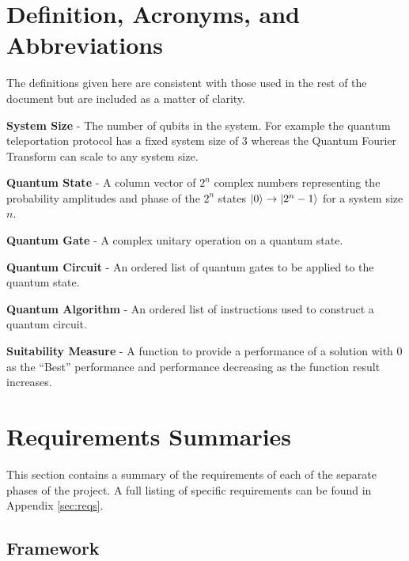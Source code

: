 % 

\section{Definition, Acronyms, and Abbreviations}
The definitions given here are consistent with those used in the rest of the document but are included as a matter of clarity.

\textbf{System Size} - The number of qubits in the system. For example the quantum teleportation protocol has a fixed system size of 3 whereas the Quantum Fourier Transform can scale to any system size.

\textbf{Quantum State} - A column vector of $2^n$ complex numbers representing the probability amplitudes and phase of the $2^n$ states $\left\vert{0}\right\rangle\rightarrow\left\vert{2^n-1}\right\rangle$ for a system size $n$.

\textbf{Quantum Gate} - A complex unitary operation on a quantum state.

\textbf{Quantum Circuit} - An ordered list of quantum gates to be applied to the quantum state.

\textbf{Quantum Algorithm} - An ordered list of instructions used to construct a quantum circuit.

\textbf{Suitability Measure} - A function to provide a performance of a solution with $0$ as the ``Best'' performance and performance decreasing as the function result increases.


\section{Requirements Summaries}
This section contains a summary of the requirements of each of the separate phases of the project.
A full listing of specific requirements can be found in Appendix \ref{sec:reqs}.

\subsection{Framework}
